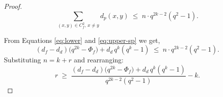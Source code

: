 \documentclass[10pt,a4paper]{amsart}
\begin{document}
\begin{proof}
    \begin{equation}\label{eq:upper-sp}
    \sum_{(x, y) \in {C}_f^2,\, x \neq y} d_p(x, y)
    \;\leq\; n \cdot q^{2k - 2} (q^2 - 1).
    \end{equation}
    \medskip

 
    From Equations \eqref{eq:lower} and \eqref{eq:upper-sp} we get,
    \[
    (d_f-d_d)\bigl(q^{2k}-\Phi_f\bigr) + d_d\,q^k(q^k-1)
    \;\leq\;
    n \cdot q^{2k - 2} (q^2 - 1).
    \]
    Substituting $n = k+r$ and rearranging:
    \[
        r
    \;\geq \;
    \frac{(d_f-d_d)\bigl(q^{2k}-\Phi_f\bigr) + d_d\,q^k(q^k-1)}
       { q^{2k - 2} (q^2 - 1)} - k.
    \]
    \end{proof}
\end{document}
